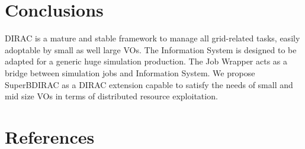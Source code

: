 \documentclass[a4paper]{jpconf}
\begin{document}
\section{Conclusions}
DIRAC is a mature and stable framework to manage all grid-related tasks, easily adoptable by small as well large VOs.
The Information System is designed to be adapted for a generic huge simulation production.
The Job Wrapper acts as a bridge between simulation jobs and Information System.
We propose SuperBDIRAC as a DIRAC extension capable to satisfy the needs of small and mid size VOs in terms of distributed
resource exploitation.




\section*{References}
\end{document}
